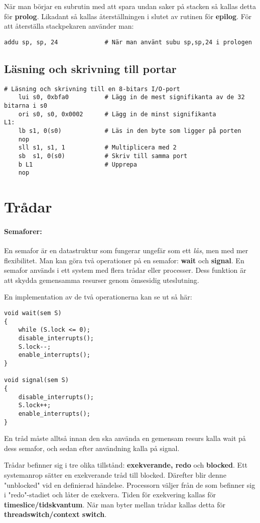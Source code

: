 \documentclass[a4paper]{article}
\begin{document}
När man börjar en subrutin med att spara undan saker på stacken så kallas detta för \textbf{prolog}. Likadant så kallas återställningen i slutet av rutinen för \textbf{epilog}. För att återställa stackpekaren använder man:
\begin{verbatim}
addu sp, sp, 24             # När man använt subu sp,sp,24 i prologen
\end{verbatim}

\subsection{Läsning och skrivning till portar}
\begin{verbatim}
# Läsning och skrivning till en 8-bitars I/O-port
    lui s0, 0xbfa0          # Lägg in de mest signifikanta av de 32 bitarna i s0
    ori s0, s0, 0x0002      # Lägg in de minst signifikanta
L1:
    lb s1, 0(s0)            # Läs in den byte som ligger på porten
    nop
    sll s1, s1, 1           # Multiplicera med 2
    sb  s1, 0(s0)           # Skriv till samma port
    b L1                    # Upprepa
    nop
\end{verbatim}
\section{Trådar}
\paragraph{Semaforer:} En semafor är en datastruktur som fungerar ungefär som ett \emph{lås}, men med mer flexibilitet. Man kan göra två operationer på en semafor: \textbf{wait} och \textbf{signal}. En semafor används i ett system med flera trådar eller processer. Dess funktion är att skydda gemensamma resurser genom ömsesidig uteslutning.

En implementation av de två operationerna kan se ut så här:

\begin{verbatim}
void wait(sem S)
{
    while (S.lock <= 0);
    disable_interrupts();
    S.lock--;
    enable_interrupts();
}

void signal(sem S)
{
    disable_interrupts();
    S.lock++;
    enable_interrupts();
}
\end{verbatim}
En tråd måste alltså innan den ska använda en gemensam resurs kalla wait på dess semafor, och sedan efter användning kalla på signal.

Trådar befinner sig i tre olika tillstånd: \textbf{exekverande, redo} och \textbf{blocked}. Ett systemanrop sätter en exekverande tråd till blocked. Därefter blir denne "unblocked" vid en definierad händelse. Processorn väljer från de som befinner sig i "redo"-stadiet och låter de exekvera. Tiden för exekvering kallas för \textbf{timeslice/tidskvantum}. När man byter mellan trådar kallas detta för \textbf{threadswitch/context switch}.
\end{document}
